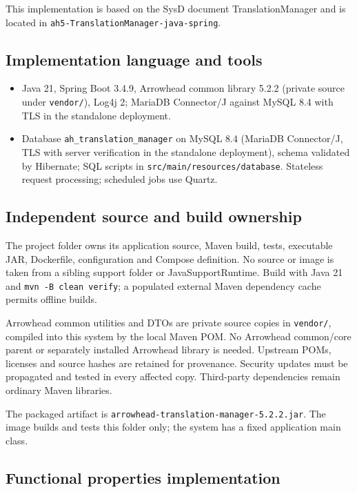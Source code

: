 \documentclass[a4paper]{arrowhead}
\begin{document}
This implementation is based on the SysD document TranslationManager \cite{tm-sysd} and is located in \texttt{ah5-TranslationManager-java-spring}.

\subsection{Implementation language and tools}
\begin{itemize}
\item Java 21, Spring Boot 3.4.9, Arrowhead common library 5.2.2 (private source under \texttt{vendor/}), Log4j 2; MariaDB Connector/J against MySQL 8.4 with TLS in the standalone deployment.
\item Database \texttt{ah\_\allowbreak{}translation\_\allowbreak{}manager} on MySQL 8.4 (MariaDB Connector/J, TLS with server verification in the standalone deployment), schema validated by Hibernate; SQL scripts in \texttt{src/\allowbreak{}main/\allowbreak{}resources/\allowbreak{}database}. Stateless request processing; scheduled jobs use Quartz.
\end{itemize}

\subsection{Independent source and build ownership}
The project folder owns its application source, Maven build, tests, executable JAR, Dockerfile, configuration and Compose definition. No source or image is taken from a sibling support folder or JavaSupportRuntime. Build with Java 21 and \texttt{mvn -B clean verify}; a populated external Maven dependency cache permits offline builds.

Arrowhead common utilities and DTOs are private source copies in \texttt{vendor/}, compiled into this system by the local Maven POM. No Arrowhead common/core parent or separately installed Arrowhead library is needed. Upstream POMs, licenses and source hashes are retained for provenance. Security updates must be propagated and tested in every affected copy. Third-party dependencies remain ordinary Maven libraries.

The packaged artifact is \texttt{arrowhead-\allowbreak{}translation-\allowbreak{}manager-5.2.2.jar}. The image builds and tests this folder only; the system has a fixed application main class.

\subsection{Functional properties implementation}
\end{document}
